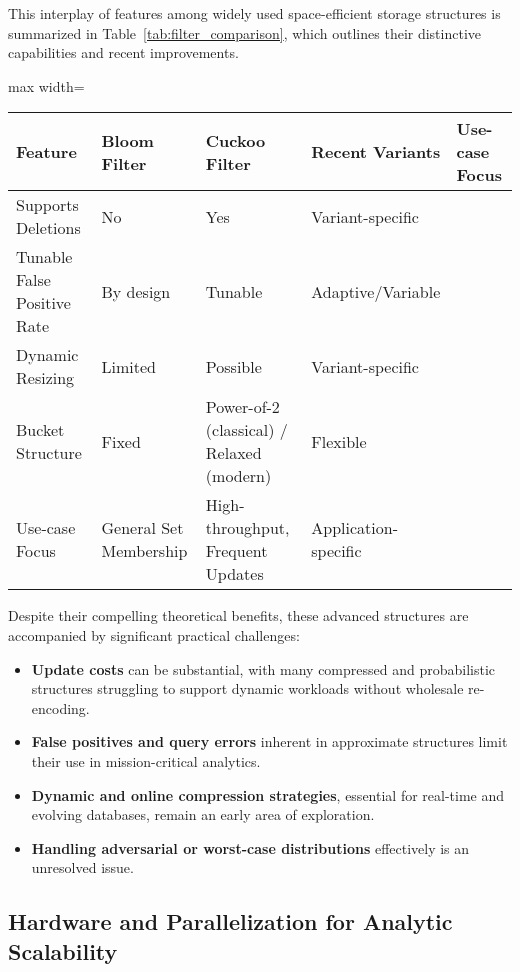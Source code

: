 This interplay of features among widely used space-efficient storage structures is summarized in Table~\ref{tab:filter_comparison}, which outlines their distinctive capabilities and recent improvements.

\begin{table*}[htbp]
\centering
\caption{Salient Features of Probabilistic and Compressed Storage Structures}
\label{tab:filter_comparison}
\begin{adjustbox}{max width=\textwidth}
\begin{tabular}{lllll}
\toprule
Feature & Bloom Filter & Cuckoo Filter & Recent Variants & Use-case Focus \\
\midrule
Supports Deletions & No & Yes & Variant-specific & \\
Tunable False Positive Rate & By design & Tunable & Adaptive/Variable & \\
Dynamic Resizing & Limited & Possible & Variant-specific & \\
Bucket Structure & Fixed & Power-of-2 (classical) / Relaxed (modern) & Flexible & \\
Use-case Focus & General Set Membership & High-throughput, Frequent Updates & Application-specific & \\
\bottomrule
\end{tabular}
\end{adjustbox}
\end{table*}

Despite their compelling theoretical benefits, these advanced structures are accompanied by significant practical challenges:
\begin{itemize}
    \item \textbf{Update costs} can be substantial, with many compressed and probabilistic structures struggling to support dynamic workloads without wholesale re-encoding.
    \item \textbf{False positives and query errors} inherent in approximate structures limit their use in mission-critical analytics.
    \item \textbf{Dynamic and online compression strategies}, essential for real-time and evolving databases, remain an early area of exploration.
    \item \textbf{Handling adversarial or worst-case distributions} effectively is an unresolved issue.
\end{itemize}

\subsection{Hardware and Parallelization for Analytic Scalability}

